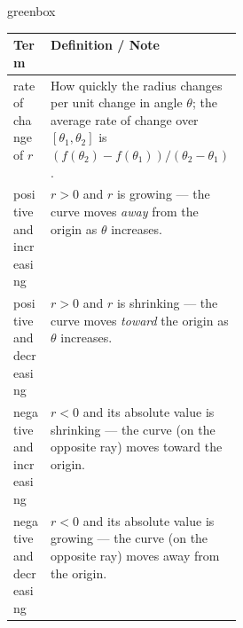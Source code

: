 \documentclass[10pt]{article}
\begin{document}
\vspace{0.08in}

\begin{skillbox}{greenbox}
\begin{tabularx}{\linewidth}{@{} p{0.30\linewidth} X @{}}
\textbf{Term} & \textbf{Definition / Note} \\
\midrule
rate of change of $r$ &
  How quickly the radius changes per unit change in angle $\theta$; the
  average rate of change over $[\theta_1, \theta_2]$ is
  $(f(\theta_2)-f(\theta_1))/(\theta_2-\theta_1)$. \\[4pt]
positive and increasing &
  $r > 0$ and $r$ is growing --- the curve moves \emph{away} from the origin
  as $\theta$ increases. \\[4pt]
positive and decreasing &
  $r > 0$ and $r$ is shrinking --- the curve moves \emph{toward} the origin
  as $\theta$ increases. \\[4pt]
negative and increasing &
  $r < 0$ and its absolute value is shrinking --- the curve (on the opposite
  ray) moves toward the origin. \\[4pt]
negative and decreasing &
  $r < 0$ and its absolute value is growing --- the curve (on the opposite
  ray) moves away from the origin. \\
\end{tabularx}
\end{skillbox}

\vspace{0.08in}
\end{document}

